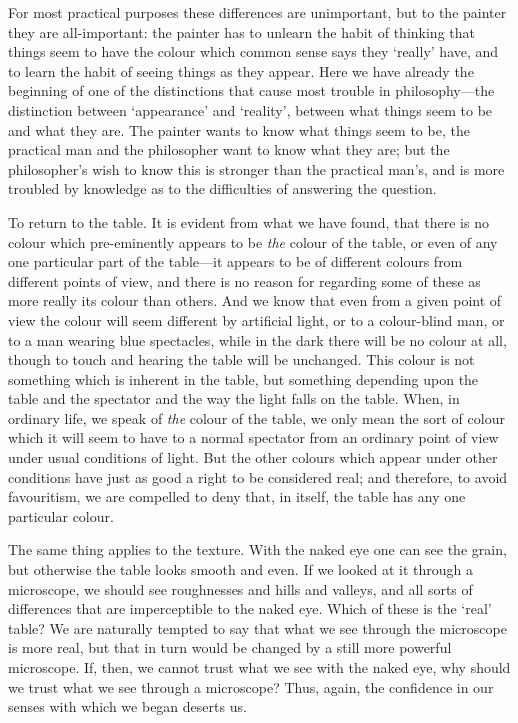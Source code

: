 \documentclass[oneside,letterpaper,12pt]{book}
\begin{document}
For most practical purposes these differences are unimportant, but to
the painter they are all-important: the painter has to unlearn the habit
of thinking that things seem to have the colour which common sense says
they `really' have, and to learn the
habit of seeing things as they appear. Here we have already the
beginning of one of the distinctions that cause most trouble in
philosophy---the distinction between
`appearance' and
`reality', between what things seem to be
and what they are. The painter wants to know what things seem to be, the
practical man and the philosopher want to know what they are; but the
philosopher's wish to know this is stronger than the
practical man's, and is more troubled by knowledge as to
the difficulties of answering the question.

To return to the table. \label{evident} It is evident from what we have found, that
there is no colour which pre-eminently appears to be \emph{the} colour
of the table, or even of any one particular part of the table---it
appears to be of different colours from different points of view, and
there is no reason for regarding some of these as more really its colour
than others. And we know that even from a given point of view the colour
will seem different by artificial light, or to a colour-blind man, or to
a man wearing blue spectacles, while in the dark there will be no colour
at all, though to touch and hearing the table will be unchanged. This
colour is not something which is inherent in the table, but something
depending upon the table and the spectator and the way the light falls
on the table. When, in ordinary life, we speak of \emph{the} colour of
the table, we only mean the sort of colour which it will seem to have to
a normal spectator from an ordinary point of view under usual conditions
of light. But the other colours which appear under other conditions have
just as good a right to be considered real; and therefore, to avoid
favouritism, we are compelled to deny that, in itself, the table has any
one particular colour.

The same thing applies to the texture. With the naked eye one can see
the grain, but otherwise the table looks smooth and even. If we looked
at it through a microscope, we should see roughnesses and hills and
valleys, and all sorts of differences that are imperceptible to the
naked eye. Which of these is the `real'
table? We are naturally tempted to say that what we see through the
microscope is more real, but that in turn would be changed by a still
more powerful microscope. If, then, we cannot trust what we see with the
naked eye, why should we trust what we see through a microscope? Thus,
again, the confidence in our senses with which we began deserts us.
\end{document}
